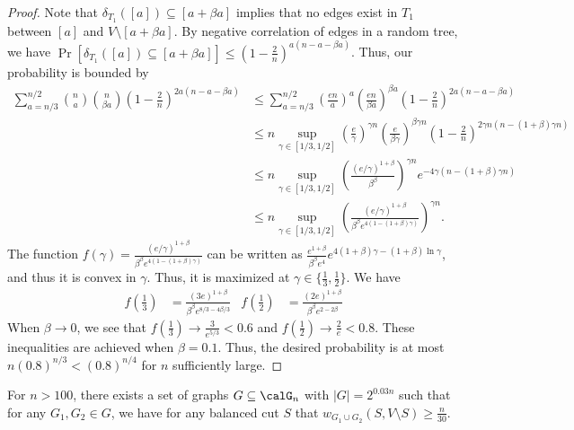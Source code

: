 \begin{proof}
Note that $\delta_{T_1}([a]) \subseteq [a + \beta a]$ implies that no edges exist in $T_1$ between $[a]$ and $V \setminus [a + \beta a]$. By negative correlation of edges in a random tree, we have $\Pr[\delta_{T_1}([a]) \subseteq [a + \beta a]] \leq (1-\frac{2}{n})^{a (n-a-\beta a)}$. Thus, our probability is bounded by 
\begin{align*}
    \sum_{a = n/3}^{n/2} \binom{n}{a} \binom{n}{\beta a} \left(1-\frac{2}{n}\right)^{2a (n-a-\beta a)} &\leq \sum_{a = n/3}^{n/2} \left(\frac{en}{a}\right)^a \left(\frac{en}{\beta a}\right)^{\beta a}\left(1-\frac{2}{n}\right)^{2a (n-a-\beta a)} \\
    &\leq n \sup_{\gamma \in [1/3, 1/2]} \left(\frac{e}{\gamma}\right)^{\gamma n} \left(\frac{e}{\beta \gamma}\right)^{\beta \gamma n}\left(1-\frac{2}{n}\right)^{2\gamma n(n-(1+\beta)\gamma n )} \\
    &\leq n \sup_{\gamma \in [1/3, 1/2]} \left(\frac{(e/\gamma)^{1+\beta}}{\beta^\beta}\right)^{\gamma n} e^{-4\gamma (n-(1+\beta)\gamma n )} \\
    &\leq n \sup_{\gamma \in [1/3, 1/2]} \left(\frac{(e/\gamma)^{1+\beta}}{\beta^\beta e^{4(1-(1+\beta)\gamma)}}\right)^{\gamma n}.
\end{align*}
The function $f(\gamma) = \frac{(e/\gamma)^{1+\beta}}{\beta^\beta e^{4(1-(1+\beta)\gamma)}}$ can be written as $\frac{e^{1+\beta}}{\beta^\beta e^4}e^{4(1+\beta) \gamma - (1+\beta) \ln \gamma}$, and thus it is convex in $\gamma$. Thus, it is maximized at $\gamma \in \{\frac{1}{3}, \frac{1}{2}\}$. We have
\begin{align*}
    f(\frac{1}{3}) &= \frac{(3e)^{1+\beta}}{\beta^\beta e^{8/3 - 4\beta/3}} & f(\frac{1}{2}) &= \frac{(2e)^{1+\beta}}{\beta^\beta e^{2-2\beta}}
\end{align*}
When $\beta \rightarrow 0$, we see that $f(\frac{1}{3}) \rightarrow \frac{3}{e^{5/3}} < 0.6$ and $f(\frac{1}{2}) \rightarrow \frac{2}{e} < 0.8$. These inequalities are achieved when $\beta = 0.1$. Thus, the desired probability is at most $n (0.8)^{n/3} < (0.8)^{n/4}$ for $n$ sufficiently large.


\end{proof}
\begin{lem}\label{lem:packing}
For $n > 100$, there exists a set of graphs $G \subseteq \calG_n$ with $|G| = 2^{0.03 n}$ such that for any $G_1, G_2 \in G$, we have for any balanced cut $S$ that $w_{G_1 \cup G_2}(S, V \setminus S) \geq \frac{n}{30}$.
\end{lem}

